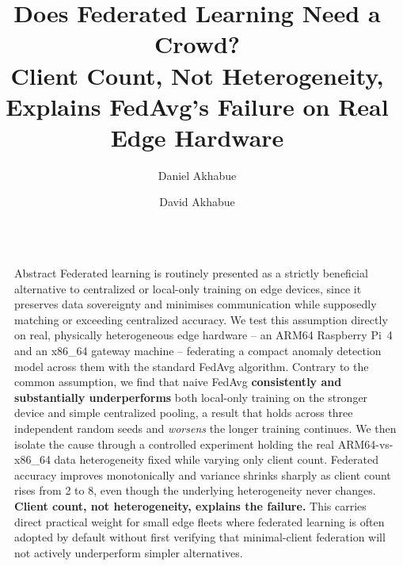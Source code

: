 \documentclass[final]{beamer}
\title{Does Federated Learning Need a Crowd?\\[0.3ex]
{\large Client Count, Not Heterogeneity, Explains FedAvg's Failure on Real Edge Hardware}}
\author{Daniel Akhabue\inst{1,2} \and David Akhabue\inst{2}}
\institute[shortinst]{%
  \inst{1}~Qucoon, Nigeria \quad
  \inst{2}~Machine Learning Collective (MLC)\\[0.4ex]
  \href{mailto:danakhabue@gmail.com}{danakhabue@gmail.com} \quad
  \href{mailto:daviesakhs009@gmail.com}{daviesakhs009@gmail.com}}
\newlength{\sepwidth}
\newlength{\colwidth}
\newcommand{\separatorcolumn}{\begin{column}{\sepwidth}\end{column}}
\begin{document}
\begin{frame}[t]
\begin{columns}[t]
\separatorcolumn

\begin{column}{\colwidth}

  \begin{block}{Abstract}
    \small
    Federated learning is routinely presented as a strictly beneficial
    alternative to centralized or local-only training on edge devices,
    since it preserves data sovereignty and minimises communication while
    supposedly matching or exceeding centralized accuracy. We test this
    assumption directly on real, physically heterogeneous edge hardware
    -- an ARM64 Raspberry Pi~4 and an x86\_64 gateway machine --
    federating a compact anomaly detection model across them with the
    standard FedAvg algorithm. Contrary to the common assumption, we find
    that naive FedAvg \textbf{consistently and substantially underperforms}
    both local-only training on the stronger device and simple centralized
    pooling, a result that holds across three independent random seeds and
    \textit{worsens} the longer training continues. We then isolate the
    cause through a controlled experiment holding the real ARM64-vs-x86\_64
    data heterogeneity fixed while varying only client count. Federated
    accuracy improves monotonically and variance shrinks sharply as client
    count rises from 2 to 8, even though the underlying heterogeneity never
    changes. \textbf{Client count, not heterogeneity, explains the failure.}
    This carries direct practical weight for small edge fleets where
    federated learning is often adopted by default without first verifying
    that minimal-client federation will not actively underperform simpler
    alternatives.
  \end{block}


\end{column}
\end{columns}
\end{frame}
\end{document}
